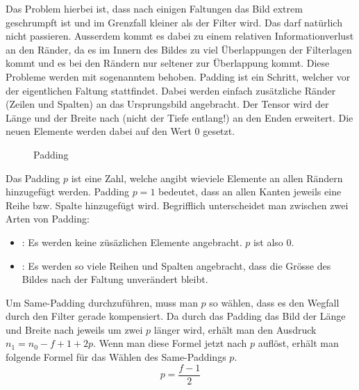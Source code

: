 Das Problem hierbei ist, dass nach einigen Faltungen das Bild extrem geschrumpft
ist und im Grenzfall kleiner als der Filter wird. Das darf natürlich nicht
passieren. Ausserdem kommt es dabei zu einem relativen Informationverlust an den Ränder, da es im
Innern des Bildes zu viel Überlappungen der Filterlagen kommt und es bei den
Rändern nur seltener zur Überlappung kommt.
\para{}
Diese Probleme werden mit sogenanntem  behoben. Padding ist ein
Schritt, welcher vor der eigentlichen Faltung stattfindet. Dabei werden einfach
zusätzliche Ränder (Zeilen und Spalten) an das Ursprungsbild angebracht. Der
Tensor wird der Länge und der Breite nach (nicht der Tiefe entlang!) an den Enden erweitert. Die neuen Elemente werden dabei auf den Wert
$0$ gesetzt.

\begin{figure}[h!]

  \caption{Padding}
\end{figure}

Das Padding $p$ ist eine Zahl, welche angibt wieviele Elemente an allen Rändern
hinzugefügt werden. Padding $p = 1$ bedeutet, dass an allen Kanten jeweils eine
Reihe bzw. Spalte hinzugefügt wird.
Begrifflich unterscheidet man zwischen zwei Arten von Padding:
\begin{itemize}
\item{: Es werden keine züsäzlichen Elemente angebracht. $p$ ist also 0.}
\item{: Es werden so viele Reihen und Spalten angebracht, dass
    die Grösse des Bildes nach der Faltung unverändert bleibt.}
\end{itemize}
\para{}
Um Same-Padding durchzuführen, muss man $p$ so wählen, dass es den Wegfall durch
den Filter gerade kompensiert. Da durch das Padding das Bild der Länge und
Breite nach jeweils um zwei $p$ länger wird, erhält man den Ausdruck $n_1 =
n_0 - f + 1 + 2p$. Wenn man diese Formel jetzt nach $p$ auflöst,
erhält man folgende Formel für das Wählen des Same-Paddings $p$.
\\
\begin{equation}
  p = \frac{f-1}{2}
\end{equation}

\cite{deeplearning.ai:cnn}

